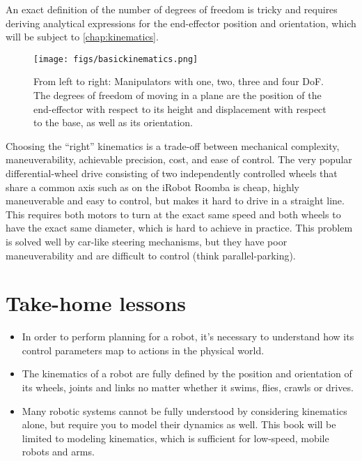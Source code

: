 An exact definition of the number of degrees of freedom is tricky and requires deriving analytical expressions for the end-effector position and orientation, which will be subject to \cref{chap:kinematics}.

\begin{figure}
	\centering
		\texttt{[image: figs/basickinematics.png]}
	\caption{From left to right: Manipulators with one, two, three and four DoF. The degrees of freedom of moving in a plane are the position of the end-effector with respect to its height and displacement with respect to the base, as well as its orientation.}
	\label{fig:basickinematics}
\end{figure}

Choosing the ``right'' kinematics is a trade-off between mechanical complexity, maneuverability, achievable precision, cost, and ease of control. The very popular differential-wheel drive consisting of two independently controlled wheels that share a common axis such as on the iRobot Roomba is cheap, highly maneuverable and easy to control, but makes it hard to drive in a straight line. This requires both motors to turn at the exact same speed and both wheels to have the exact same diameter, which is hard to achieve in practice. This problem is solved well by car-like steering mechanisms, but they have poor maneuverability and are difficult to control (think parallel-parking).


\section*{Take-home lessons}

\begin{itemize}
\item In order to perform planning for a robot, it's necessary to understand how its control parameters map to actions in the physical world.
\item The kinematics of a robot are fully defined by the position and orientation of its wheels, joints and links no matter whether it swims, flies, crawls or drives.
\item Many robotic systems cannot be fully understood by considering kinematics alone, but require you to model their dynamics as well. This book will be limited to modeling kinematics, which is sufficient for low-speed, mobile robots and arms.
\end{itemize}


